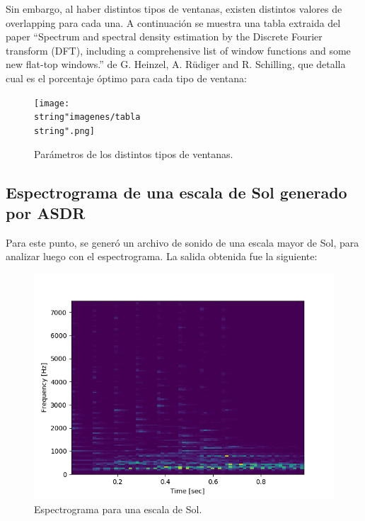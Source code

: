 \documentclass[../ASSD_TP2.tex]{subfiles}
\begin{document}
Sin embargo, al haber distintos tipos de ventanas, existen distintos
valores de overlapping para cada una. A continuación se muestra una
tabla extraida del paper ``Spectrum and spectral density estimation
by the Discrete Fourier transform (DFT), including a comprehensive
list of window functions and some new flat-top windows.'' de G. Heinzel\textasteriskcentered ,
A. Ru\"{ }diger and R. Schilling, que detalla cual es el porcentaje
óptimo para cada tipo de ventana:

\begin{figure}[H]

\begin{centering}
\texttt{[image: \\string"imagenes/tabla\\string".png]}\caption{Parámetros de los distintos tipos de ventanas.}
\par\end{centering}
\end{figure}


\subsection{Espectrograma de una escala de Sol generado por ASDR}

Para este punto, se generó un archivo de sonido de una escala mayor
de Sol, para analizar luego con el espectrograma. La salida obtenida
fue la siguiente:

\begin{figure}[H]

\begin{centering}
\includegraphics[scale=0.6]{imagenes/espectrograma}\caption{Espectrograma para una escala de Sol.}
\par\end{centering}
\end{figure}
\end{document}
